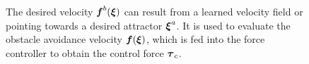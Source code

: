 \begin{figure}[thb]
  \center
  
\caption{The desired velocity $\boldsymbol{f}^b(\boldsymbol{\xi})$ can result from a learned velocity field or pointing towards a desired attractor $\boldsymbol{\xi}^a$. It is used to evaluate the obstacle avoidance velocity $\boldsymbol{f}(\boldsymbol{\xi})$, which is fed into the force controller to obtain the control force $\boldsymbol{\tau}_c$.}
\label{fig:control_scheme_passive}
\end{figure}
